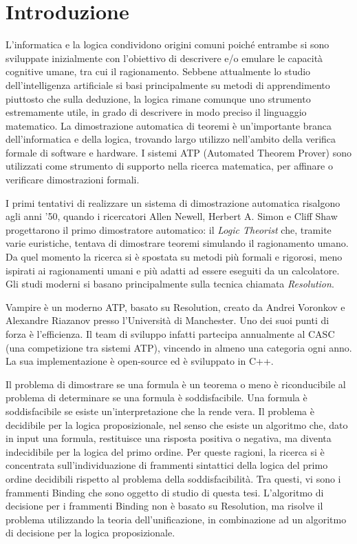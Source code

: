 \documentclass[./main.tex]{subfiles}
\begin{document}
\chapter*{Introduzione}


L'informatica e la logica condividono origini comuni poiché 
entrambe si sono sviluppate inizialmente con l'obiettivo di descrivere e/o 
emulare le capacità cognitive umane, tra cui il ragionamento.
Sebbene attualmente lo studio dell'intelligenza artificiale si basi principalmente su metodi di apprendimento 
piuttosto che sulla deduzione, la logica rimane comunque uno strumento estremamente utile,
in grado di descrivere in modo preciso il linguaggio matematico.
La dimostrazione automatica di teoremi è un'importante branca dell'informatica e della logica,
trovando largo utilizzo nell'ambito della verifica formale di software e hardware.
I sistemi ATP (Automated Theorem Prover) sono utilizzati come strumento di supporto 
nella ricerca matematica, per affinare o verificare dimostrazioni formali.
%

I primi tentativi di realizzare un sistema 
di dimostrazione automatica risalgono agli anni '50,
quando i ricercatori Allen Newell, Herbert A. Simon e Cliff Shaw
progettarono il primo dimostratore automatico: il \textit{Logic Theorist}
che, tramite varie euristiche, tentava di dimostrare teoremi simulando il ragionamento umano. 
Da quel momento la ricerca si è spostata su metodi più formali e rigorosi,
meno ispirati ai ragionamenti umani e più adatti ad essere eseguiti da un calcolatore.
Gli studi moderni si basano principalmente sulla tecnica chiamata \textit{Resolution}.
%  

Vampire è un moderno ATP, basato su Resolution, creato da Andrei Voronkov e Alexandre Riazanov presso l'Università di Manchester.
Uno dei suoi punti di forza è l’efficienza. Il team di sviluppo infatti partecipa
annualmente al CASC (una competizione tra sistemi ATP),
vincendo in almeno una categoria ogni anno.
La sua implementazione è open-source ed è sviluppato in C++.

%

Il problema di dimostrare se una formula è un teorema o meno è riconducibile al problema di determinare
se una formula è soddisfacibile.
Una formula è soddisfacibile se esiste un'interpretazione che la rende vera.
Il problema è decidibile per la logica proposizionale, nel senso che esiste un algoritmo
che, dato in input una formula, restituisce una risposta positiva o negativa,
ma diventa indecidibile per la logica del primo ordine.
Per queste ragioni, la ricerca si è concentrata sull'individuazione di frammenti sintattici della logica del primo ordine
decidibili rispetto al problema della soddisfacibilità.
Tra questi, vi sono i frammenti Binding che sono oggetto di studio di questa tesi.
L'algoritmo di decisione per i frammenti Binding non è basato su Resolution,
ma risolve il problema utilizzando la teoria dell'unificazione, in combinazione 
ad un algoritmo di decisione per la logica proposizionale.
\end{document}
